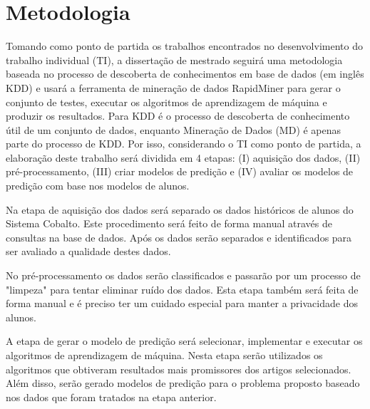 \documentclass[diss-proposta,nocipinfo]{texufpel}
\begin{document}

\chapter{Metodologia}

Tomando como ponto de partida os trabalhos encontrados no desenvolvimento do trabalho individual (TI), a dissertação de mestrado seguirá uma metodologia baseada no processo de descoberta de conhecimentos em base de dados (em inglês KDD) e usará a ferramenta de mineração de dados RapidMiner para gerar o conjunto de testes, executar os algoritmos de aprendizagem de máquina e produzir os resultados. Para \citet{fayyad1996kdd} KDD é o processo de descoberta de conhecimento útil de um conjunto de dados, enquanto Mineração de Dados (MD) é apenas parte do processo de KDD. Por isso, considerando o TI como ponto de partida, a elaboração deste trabalho será dividida em 4 etapas: (I) aquisição dos dados, (II) pré-processamento, (III) criar modelos de predição e (IV) avaliar os modelos de predição com base nos modelos de alunos.

Na etapa de aquisição dos dados será separado os dados históricos de alunos do Sistema Cobalto. Este procedimento será feito de forma manual através de consultas na base de dados. Após os dados serão separados e identificados para ser avaliado a qualidade destes dados.

No pré-processamento os dados serão classificados e passarão por um processo de "limpeza" para tentar eliminar ruído dos dados. Esta etapa também será feita de forma manual e é preciso ter um cuidado especial para manter a privacidade dos alunos.

A etapa de gerar o modelo de predição será selecionar, implementar e executar os algoritmos de aprendizagem de máquina. Nesta etapa serão utilizados os algoritmos que obtiveram resultados mais promissores dos artigos selecionados. Além disso, serão gerado modelos de predição para o problema proposto baseado nos dados que foram tratados na etapa anterior.
\end{document}
